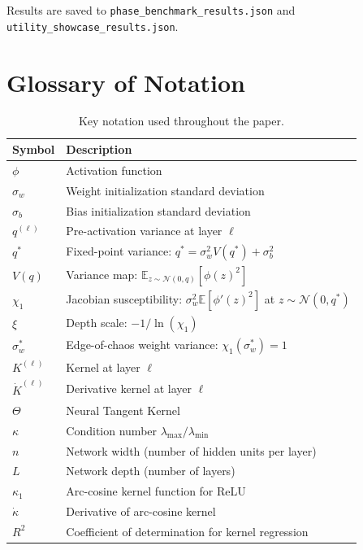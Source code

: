\documentclass[10pt]{article}
\theoremstyle{definition}
\begin{document}
Results are saved to \texttt{phase\_benchmark\_results.json} and \texttt{utility\_showcase\_results.json}.

\section{Glossary of Notation}
\label{app:glossary}

\begin{table}[htbp]
\centering
\caption{Key notation used throughout the paper.}
\label{tab:glossary}
\begin{tabular}{lp{10cm}}
\toprule
Symbol & Description \\
\midrule
$\phi$ & Activation function \\
$\sigma_w$ & Weight initialization standard deviation \\
$\sigma_b$ & Bias initialization standard deviation \\
$q^{(\ell)}$ & Pre-activation variance at layer $\ell$ \\
$q^*$ & Fixed-point variance: $q^* = \sigma_w^2 V(q^*) + \sigma_b^2$ \\
$V(q)$ & Variance map: $\mathbb{E}_{z \sim \mathcal{N}(0,q)}[\phi(z)^2]$ \\
$\chi_1$ & Jacobian susceptibility: $\sigma_w^2 \mathbb{E}[\phi'(z)^2]$ at $z \sim \mathcal{N}(0, q^*)$ \\
$\xi$ & Depth scale: $-1/\ln(\chi_1)$ \\
$\sigma_w^*$ & Edge-of-chaos weight variance: $\chi_1(\sigma_w^*) = 1$ \\
$K^{(\ell)}$ & Kernel at layer $\ell$ \\
$\dot{K}^{(\ell)}$ & Derivative kernel at layer $\ell$ \\
$\Theta$ & Neural Tangent Kernel \\
$\kappa$ & Condition number $\lambda_{\max}/\lambda_{\min}$ \\
$n$ & Network width (number of hidden units per layer) \\
$L$ & Network depth (number of layers) \\
$\kappa_1$ & Arc-cosine kernel function for ReLU \\
$\dot{\kappa}$ & Derivative of arc-cosine kernel \\
$R^2$ & Coefficient of determination for kernel regression \\
\bottomrule
\end{tabular}
\end{table}
\end{document}
